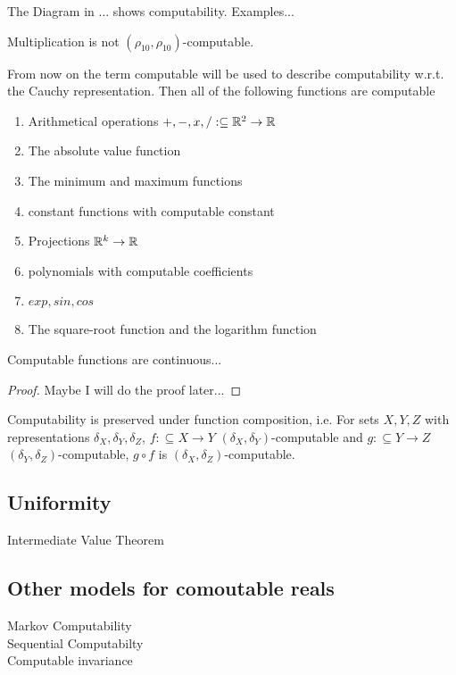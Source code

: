 The Diagram in ... shows computability.
Examples...
\begin{theorem}
Multiplication is not $(\rho_{10}, \rho_{10})$-computable.
\end{theorem}
From now on the term computable will be used to describe computability w.r.t. the Cauchy representation.
Then all of the following functions are computable
\begin{enumerate}
\item Arithmetical operations $+,-,x,/ : \subseteq \mathbb R^2 \to \mathbb R$
\item The absolute value function
\item The minimum and maximum functions
\item constant functions with computable constant
\item Projections $\mathbb R^k \to \mathbb R$ 
\item polynomials with computable coefficients
\item $exp, sin, cos$
\item The square-root function and the logarithm function
\end{enumerate}
\begin{theorem}
	Computable functions are continuous...
	\begin{proof}
		Maybe I will do the proof later...
	\end{proof}
\end{theorem}

\begin{theorem}
Computability is preserved under function composition, i.e.
For sets $X,Y,Z$ with representations $\delta_X, \delta_Y, \delta_Z$, 
$f:\subseteq X \to Y$ $(\delta_X, \delta_Y)$-computable and $g:\subseteq Y \to Z$ $(\delta_Y, \delta_Z)$-computable,
$g \circ f$ is $(\delta_X, \delta_Z)$-computable.
\end{theorem}
\subsection{Uniformity}
Intermediate Value Theorem
\subsection{Other models for comoutable reals}
Markov Computability \\ 
Sequential Computabilty \\
Computable invariance \\
